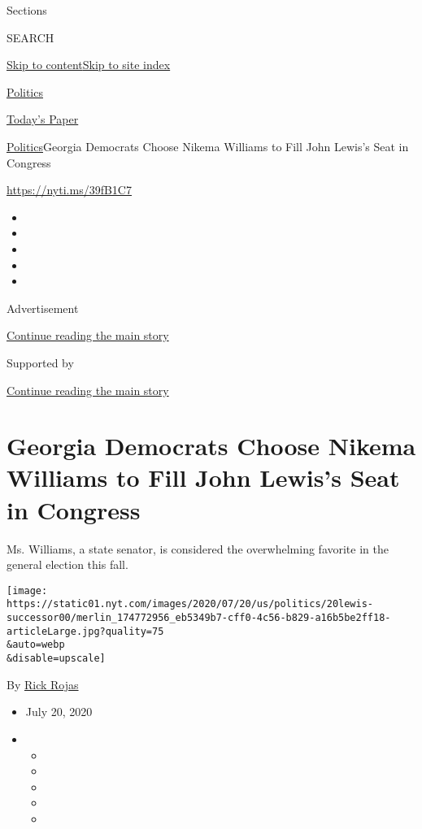 Sections

SEARCH

\protect\hyperlink{site-content}{Skip to
content}\protect\hyperlink{site-index}{Skip to site index}

\href{https://www.nytimes.com/section/politics}{Politics}

\href{https://myaccount.nytimes.com/auth/login?response_type=cookie\&client_id=vi}{}

\href{https://www.nytimes.com/section/todayspaper}{Today's Paper}

\href{/section/politics}{Politics}\textbar{}Georgia Democrats Choose
Nikema Williams to Fill John Lewis's Seat in Congress

\url{https://nyti.ms/39fB1C7}

\begin{itemize}
\item
\item
\item
\item
\item
\end{itemize}

Advertisement

\protect\hyperlink{after-top}{Continue reading the main story}

Supported by

\protect\hyperlink{after-sponsor}{Continue reading the main story}

\hypertarget{georgia-democrats-choose-nikema-williams-to-fill-john-lewiss-seat-in-congress}{%
\section{Georgia Democrats Choose Nikema Williams to Fill John Lewis's
Seat in
Congress}\label{georgia-democrats-choose-nikema-williams-to-fill-john-lewiss-seat-in-congress}}

Ms. Williams, a state senator, is considered the overwhelming favorite
in the general election this fall.

\texttt{[image: https://static01.nyt.com/images/2020/07/20/us/politics/20lewis-successor00/merlin\_174772956\_eb5349b7-cff0-4c56-b829-a16b5be2ff18-articleLarge.jpg?quality=75\\\&auto=webp\\\&disable=upscale]}

By \href{https://www.nytimes.com/by/rick-rojas}{Rick Rojas}

\begin{itemize}
\item
  July 20, 2020
\item
  \begin{itemize}
  \item
  \item
  \item
  \item
  \item
  \end{itemize}
\end{itemize}

